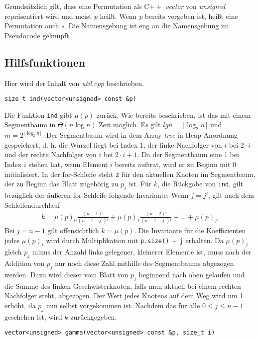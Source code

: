 \documentclass[a4paper, 11pt, ngerman]{article}
\begin{document}
\noindent Grundsätzlich gilt, dass eine Permutation als C$++$ \emph{vector} von \emph{unsigned} repräsentiert wird und meist \emph{p} heißt. Wenn \emph{p} bereits vergeben ist, heißt eine Permutation auch \emph{s}. Die Namensgebung ist eng an die Namensgebung im Pseudocode geknüpft.

\subsection{Hilfsfunktionen}

Hier wird der Inhalt von \emph{util.cpp} beschrieben.
\bigskip

\noindent \verb|size_t ind(vector<unsigned> const &p)|
\smallskip

\noindent Die Funktion \verb|ind| gibt $\mu(p)$ zurück. Wie bereits beschrieben, ist das mit einem Segmentbaum in $\Theta(n \log n)$ Zeit möglich. Es gilt $lgn = \lceil \log_2 n \rceil$ und $m = 2^{\lceil \log_2 n \rceil}$. Der Segmentbaum wird in dem Array \emph{tree} in Heap-Anordnung gespeichert, d. h. die Wurzel liegt bei Index 1, der linke Nachfolger von $i$ bei $2 \cdot i$ und der rechte Nachfolger von $i$ bei $2 \cdot i + 1$. Da der Segmentbaum eine 1 bei Index $i$ stehen hat, wenn Element $i$ bereits auftrat, wird er zu Beginn mit 0 initialisiert. In der for-Schleife steht \verb|z| für den aktuellen Knoten im Segmentbaum, der zu Beginn das Blatt zugehörig zu $p_j$ ist. Für $k$, die Rückgabe von \verb|ind|, gilt bezüglich der äußeren for-Schleife folgende Invariante: Wenn $j = j'$, gilt nach dem Schleifendurchlauf
\begin{align*}
    k = \mu(p)_0 \frac {(n - 1)!} {(n - 1 - j')!} + \mu(p)_1 \frac {(n - 2)!} {(n - 1 - j')!} + \dots + \mu(p)_{j'}
\end{align*}
Bei $j = n - 1$ gilt offensichtlich $k = \mu(p)$. Die Invariante für die Koeffizienten jedes $\mu(p)_i$ wird durch Multiplikation mit \verb|p.size() - j| erhalten. Da $\mu(p)_j$ gleich $p_j$ minus der Anzahl links gelegener, kleinerer Elemente ist, muss nach der Addition von $p_j$ nur noch diese Zahl mithilfe des Segmentbaums abgezogen werden. Dazu wird dieser vom Blatt von $p_j$ beginnend nach oben gelaufen und die Summe des linken Geschwisterknoten, falls man aktuell bei einem rechten Nachfolger steht, abgezogen. Der Wert jedes Knotens auf dem Weg wird um 1 erhöht, da $p_j$ nun selbst vorgekommen ist. Nachdem das für alle $0 \le j \le n - 1$ geschehen ist, wird $k$ zurückgegeben.
\bigskip

\noindent \verb|vector<unsigned> gamma(vector<unsigned> const &p, size_t i)|
\smallskip
\end{document}
